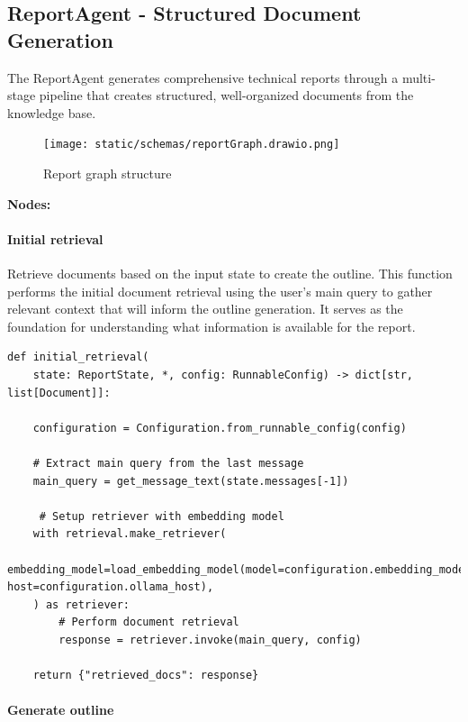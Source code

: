 \documentclass[11pt,a4paper]{report}
\begin{document}
\subsection{ReportAgent - Structured Document Generation}

The ReportAgent generates comprehensive technical reports through a multi-stage pipeline that creates structured, well-organized documents from the knowledge base.

\begin{figure}[H]
    \centering
    \texttt{[image: static/schemas/reportGraph.drawio.png]}
    \caption{Report graph structure}
    \label{fig:reportGraph}
\end{figure}

\textbf{Nodes:}\\

\paragraph{Initial retrieval}

Retrieve documents based on the input state to create the outline. This function performs the initial document retrieval using the user's main query to gather relevant context that will inform the outline generation. It serves as the foundation for understanding what information is available for the report.

\begin{lstlisting}[caption={Initial retrieval node}]
def initial_retrieval(
    state: ReportState, *, config: RunnableConfig) -> dict[str, list[Document]]:

    configuration = Configuration.from_runnable_config(config)
    
    # Extract main query from the last message
    main_query = get_message_text(state.messages[-1])

     # Setup retriever with embedding model
    with retrieval.make_retriever(
        embedding_model=load_embedding_model(model=configuration.embedding_model, host=configuration.ollama_host),   
    ) as retriever:
        # Perform document retrieval
        response = retriever.invoke(main_query, config)
        
    return {"retrieved_docs": response}
\end{lstlisting}

\paragraph{Generate outline}
\end{document}
